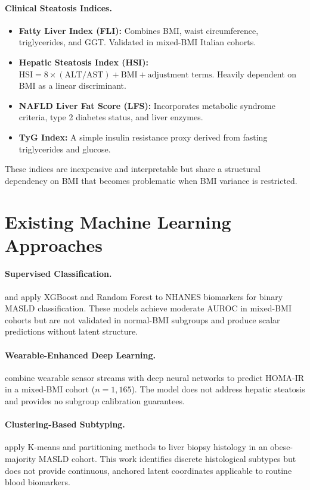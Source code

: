 \documentclass[12pt,a4paper,oneside]{report}
\begin{document}
\paragraph{Clinical Steatosis Indices.}
\begin{itemize}[leftmargin=*]
    \item \textbf{Fatty Liver Index (FLI):} Combines BMI, waist circumference, triglycerides, and GGT. Validated in mixed-BMI Italian cohorts.
    \item \textbf{Hepatic Steatosis Index (HSI):} $\text{HSI} = 8 \times (\text{ALT}/\text{AST}) + \text{BMI} + \text{adjustment terms}$. Heavily dependent on BMI as a linear discriminant.
    \item \textbf{NAFLD Liver Fat Score (LFS):} Incorporates metabolic syndrome criteria, type 2 diabetes status, and liver enzymes.
    \item \textbf{TyG Index:} A simple insulin resistance proxy derived from fasting triglycerides and glucose.
\end{itemize}

These indices are inexpensive and interpretable but share a structural dependency on BMI that becomes problematic when BMI variance is restricted.

\section{Existing Machine Learning Approaches}

\paragraph{Supervised Classification.} \citet{zhang2025} and \citet{tertulino2025} apply XGBoost and Random Forest to NHANES biomarkers for binary MASLD classification. These models achieve moderate AUROC in mixed-BMI cohorts but are not validated in normal-BMI subgroups and produce scalar predictions without latent structure.

\paragraph{Wearable-Enhanced Deep Learning.} \citet{metwally2026} combine wearable sensor streams with deep neural networks to predict HOMA-IR in a mixed-BMI cohort ($n = 1{,}165$). The model does not address hepatic steatosis and provides no subgroup calibration guarantees.

\paragraph{Clustering-Based Subtyping.} \citet{lee2024} apply K-means and partitioning methods to liver biopsy histology in an obese-majority MASLD cohort. This work identifies discrete histological subtypes but does not provide continuous, anchored latent coordinates applicable to routine blood biomarkers.
\end{document}
